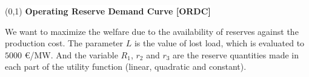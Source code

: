 \begin{center}
\boxput*(0,1){\colorbox{white}{\textbf{ Operating Reserve Demand Curve [ORDC] }}}{
\setlength{\fboxsep}{10pt}
}
\end{center}

We want to maximize the welfare due to the availability of reserves against the production cost. The parameter $L$ is the value of lost load, which is evaluated to $5000$ \euro /MW. And the variable $R_1$, $r_2$ and $r_3$ are the reserve quantities made in each part of the utility function (linear, quadratic and constant).